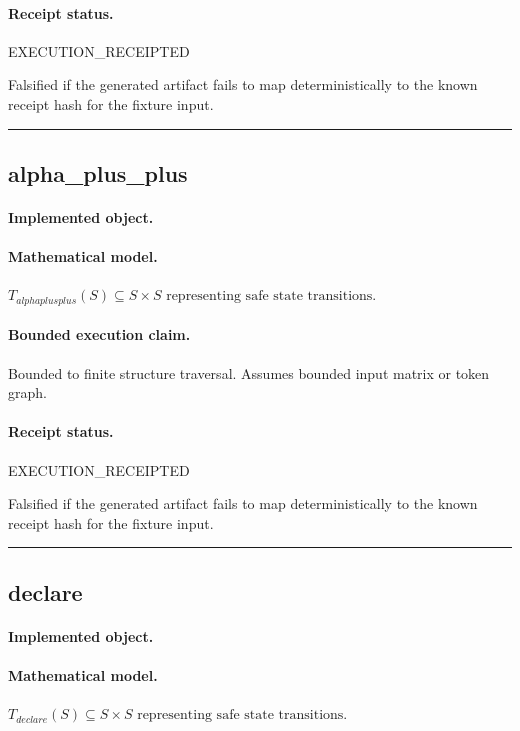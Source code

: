 \paragraph{Receipt status.} EXECUTION\_RECEIPTED
\begin{falsifier}
Falsified if the generated artifact fails to map deterministically to the known receipt hash for the fixture input.
\end{falsifier}

\vspace{1em}\hrule\vspace{1em}
\subsection{alpha\_plus\_plus}
\paragraph{Implemented object.} 
\paragraph{Mathematical model.} $T_{alphaplusplus}(S) \subseteq S \times S \text{ representing safe state transitions}.$
\paragraph{Bounded execution claim.} Bounded to finite structure traversal. Assumes bounded input matrix or token graph.
\paragraph{Receipt status.} EXECUTION\_RECEIPTED
\begin{falsifier}
Falsified if the generated artifact fails to map deterministically to the known receipt hash for the fixture input.
\end{falsifier}

\vspace{1em}\hrule\vspace{1em}
\subsection{declare}
\paragraph{Implemented object.} 
\paragraph{Mathematical model.} $T_{declare}(S) \subseteq S \times S \text{ representing safe state transitions}.$
